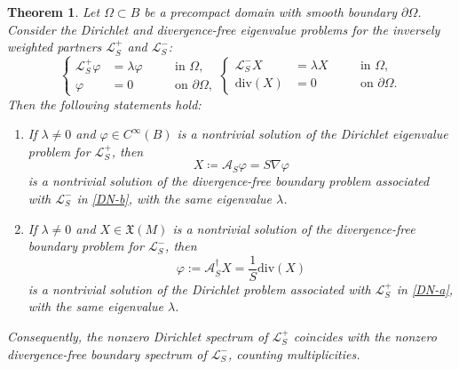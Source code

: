 \documentclass[10pt,a4paper]{amsart}
\newtheorem{theorem}{Theorem}
\newcommand{\diver}{{{\mathrm{div}}}}
\begin{document}
\begin{theorem}\label{DirichletNeumannProblem}
Let $\Omega\subset B$ be a precompact domain with smooth boundary $\partial \Omega$. Consider the Dirichlet and divergence-free eigenvalue problems for the inversely weighted partners $\mathscr{L}_S^{+}$ and $\mathscr{L}_S^{-}$:
\begin{subequations}\label{DN}
\begin{equation}\label{DN-a}
\left\{
\begin{aligned}
\mathscr{L}_S^{+}\varphi &= \lambda \varphi \quad &&\text{in } \Omega
,\\
\varphi &= 0 \quad &&\text{on } \partial \Omega,
\end{aligned}
\right.
\end{equation}

\begin{equation}\label{DN-b}
\left\{
\begin{aligned}
\mathscr{L}_S^{-}X &= \lambda X \quad &&\text{in } \Omega,\\
\diver(X) &= 0 \quad &&\text{on } \partial \Omega.
\end{aligned}
\right.
\end{equation}
\end{subequations}
Then the following statements hold:
\begin{enumerate}
 \item If $\lambda \neq 0$ and $\varphi \in C^{\infty}(B)$ is a nontrivial solution of the Dirichlet eigenvalue problem for $\mathscr L_S^{+}$, then
 \[
 X \coloneqq \mathcal A_S \varphi = S \nabla \varphi 
 \]
is a nontrivial solution of the divergence-free boundary problem associated with $\mathscr L_S^{-}$ in \eqref{DN-b}, with the same eigenvalue $\lambda$.
 \item If $\lambda \neq 0$ and $X \in \mathfrak{X}(M)$ is a nontrivial solution of the divergence-free boundary problem for $\mathscr L_S^{-}$, then
 \[
 \varphi:=\mathcal{A}^\dag_SX=\frac{1}{S}\diver(X)
 \]
 is a nontrivial solution of the Dirichlet problem associated with $\mathscr L_S^{+}$ in \eqref{DN-a}, with the same eigenvalue $\lambda$.
\end{enumerate}
Consequently, the nonzero Dirichlet spectrum of $\mathscr L_S^{+}$ coincides with the nonzero divergence-free boundary spectrum of $\mathscr L_S^{-}$, counting multiplicities. 
\end{theorem}
\end{document}

